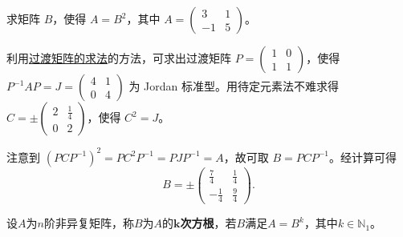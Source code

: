 \documentclass[../../main.tex]{subfiles}%
\begin{document}
\begin{example}
求矩阵 $B$，使得 $A = B^2$，其中 $A = \begin{pmatrix}
3 & 1 \\
-1 & 5
\end{pmatrix}$。
\end{example}
\begin{solution}

利用\hyperref[section:过渡矩阵的求法]{过渡矩阵的求法}的方法，可求出过渡矩阵 $P = \begin{pmatrix}
1 & 0 \\
1 & 1
\end{pmatrix}$，使得 $P^{-1}AP = J = \begin{pmatrix}
4 & 1 \\
0 & 4
\end{pmatrix}$ 为 Jordan 标准型。用待定元素法不难求得 $C = \pm\begin{pmatrix}
2 & \frac{1}{4} \\
0 & 2
\end{pmatrix}$，使得 $C^2 = J$。

注意到 $(PCP^{-1})^2 = PC^2P^{-1} = PJP^{-1} = A$，故可取 $B = PCP^{-1}$。经计算可得
\[B = \pm\begin{pmatrix}
\frac{7}{4} & \frac{1}{4} \\
-\frac{1}{4} & \frac{9}{4}
\end{pmatrix}. \]

\end{solution}

\begin{definition}
设$A$为$n$阶非异复矩阵，称$B$为$A$的\textbf{$\boldsymbol{k}$次方根}，若$B$满足$A=B^k$，其中$k\in \mathbb{N} _1$。
\end{definition}
\end{document}
